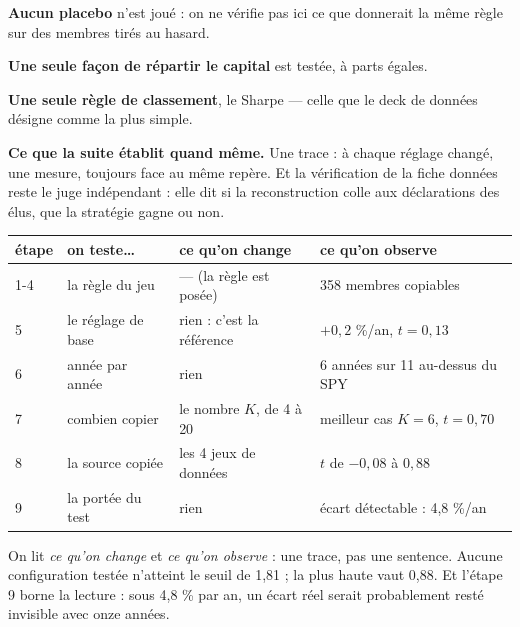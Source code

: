 \documentclass[10pt,a4paper]{article}
\begin{document}
{\begin{tcolorbox}
{\item \textbf{Aucun placebo} n'est joué : on ne vérifie pas ici ce que donnerait la même règle sur des
membres tirés au hasard.
\item \textbf{Une seule façon de répartir le capital} est testée, à parts égales.
\item \textbf{Une seule règle de classement}, le Sharpe --- celle que le deck de données désigne comme la plus simple.
}
{\footnotesize\textbf{Ce que la suite établit quand même.} Une trace : à chaque réglage changé, une mesure,
toujours face au même repère. Et la vérification de la fiche données reste le juge indépendant : elle dit
si la reconstruction colle aux déclarations des élus, que la stratégie gagne ou non.}
\end{tcolorbox}}
\vspace{2.5mm}

\begin{tcolorbox}[enhanced, colback=white, colframe=grisc, boxrule=0.5pt, arc=2pt,
                  left=3mm, right=3mm, top=1.6mm, bottom=1.6mm,
                  colbacktitle=grisf, coltitle=white, fonttitle=\footnotesize\bfseries,
                  title={LA TRACE --- ce qu'on a changé, ce qu'on a observé}]
\begin{center}\footnotesize
\begin{tabular}{@{}llll@{}}
\toprule
étape & on teste\ldots & ce qu'on change & ce qu'on observe \\
\midrule
1-4 & la règle du jeu & --- (la règle est posée) & 358 membres copiables \\
5 & le réglage de base & rien : c'est la référence & $+0{,}2$ \%/an, $t = 0{,}13$ \\
6 & année par année & rien & 6 années sur 11 au-dessus du SPY \\
7 & combien copier & le nombre $K$, de 4 à 20 & meilleur cas $K = 6$, $t = 0{,}70$ \\
8 & la source copiée & les 4 jeux de données & $t$ de $-0{,}08$ à $0{,}88$ \\
9 & la portée du test & rien & écart détectable : 4,8 \%/an \\
\bottomrule
\end{tabular}
\end{center}
\vspace{0.6mm}
{\footnotesize On lit \emph{ce qu'on change} et \emph{ce qu'on observe} : une trace, pas une sentence.
Aucune configuration testée n'atteint le seuil de 1,81 ; la plus haute vaut 0,88. Et l'étape 9 borne la
lecture : sous 4,8 \% par an, un écart réel serait probablement resté invisible avec onze années.}
\end{tcolorbox}
\end{document}
